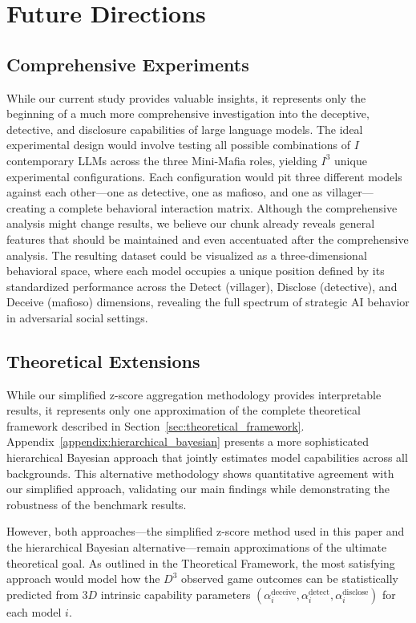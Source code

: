 \documentclass{article}
\begin{document}
\section{Future Directions}
\label{sec:future_directions}

\subsection{Comprehensive Experiments}

While our current study provides valuable insights, it represents only the beginning of a much more comprehensive investigation into the deceptive, detective, and disclosure capabilities of large language models. The ideal experimental design would involve testing all possible combinations of $I$ contemporary LLMs across the three Mini-Mafia roles, yielding $I^3$ unique experimental configurations. Each configuration would pit three different models against each other—one as detective, one as mafioso, and one as villager—creating a complete behavioral interaction matrix. Although the comprehensive analysis might change results, we believe our chunk already reveals general features that should be maintained and even accentuated after the comprehensive analysis. The resulting dataset could be visualized as a three-dimensional behavioral space, where each model occupies a unique position defined by its standardized performance across the Detect (villager), Disclose (detective), and Deceive (mafioso) dimensions, revealing the full spectrum of strategic AI behavior in adversarial social settings.


\subsection{Theoretical Extensions}

While our simplified z-score aggregation methodology provides interpretable results, it represents only one approximation of the complete theoretical framework described in Section~\ref{sec:theoretical_framework}. Appendix~\ref{appendix:hierarchical_bayesian} presents a more sophisticated hierarchical Bayesian approach that jointly estimates model capabilities across all backgrounds. This alternative methodology shows quantitative agreement with our simplified approach, validating our main findings while demonstrating the robustness of the benchmark results.

However, both approaches—the simplified z-score method used in this paper and the hierarchical Bayesian alternative—remain approximations of the ultimate theoretical goal. As outlined in the Theoretical Framework, the most satisfying approach would model how the $D^3$ observed game outcomes can be statistically predicted from $3D$ intrinsic capability parameters $(\alpha_i^{\text{deceive}}, \alpha_i^{\text{detect}}, \alpha_i^{\text{disclose}})$ for each model $i$.
\end{document}
